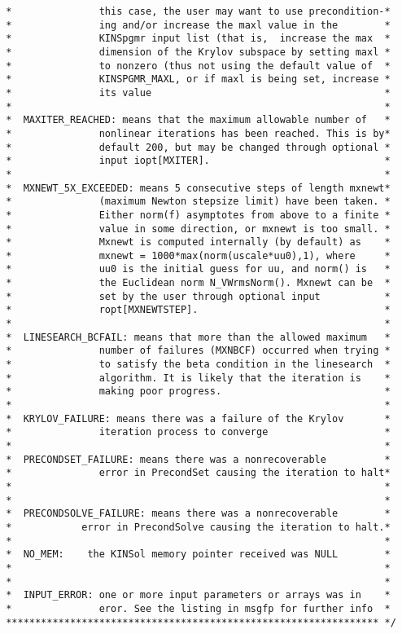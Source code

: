 \documentclass[11pt]{article}
\begin{document}
\begin{verbatim}
 *               this case, the user may want to use precondition-*
 *               ing and/or increase the maxl value in the        * 
 *               KINSpgmr input list (that is,  increase the max  *
 *               dimension of the Krylov subspace by setting maxl *
 *               to nonzero (thus not using the default value of  *
 *               KINSPGMR_MAXL, or if maxl is being set, increase *
 *               its value                                        *
 *                                                                *
 *  MAXITER_REACHED: means that the maximum allowable number of   *
 *               nonlinear iterations has been reached. This is by*
 *               default 200, but may be changed through optional *
 *               input iopt[MXITER].                              *
 *                                                                *
 *  MXNEWT_5X_EXCEEDED: means 5 consecutive steps of length mxnewt*
 *               (maximum Newton stepsize limit) have been taken. *
 *               Either norm(f) asymptotes from above to a finite *
 *               value in some direction, or mxnewt is too small. *
 *               Mxnewt is computed internally (by default) as    *
 *               mxnewt = 1000*max(norm(uscale*uu0),1), where     *
 *               uu0 is the initial guess for uu, and norm() is   *
 *               the Euclidean norm N_VWrmsNorm(). Mxnewt can be  *
 *               set by the user through optional input           *
 *               ropt[MXNEWTSTEP].                                *
 *                                                                *
 *  LINESEARCH_BCFAIL: means that more than the allowed maximum   *
 *               number of failures (MXNBCF) occurred when trying *
 *               to satisfy the beta condition in the linesearch  *
 *               algorithm. It is likely that the iteration is    *
 *               making poor progress.                            *
 *                                                                *
 *  KRYLOV_FAILURE: means there was a failure of the Krylov       *
 *               iteration process to converge                    *
 *                                                                *
 *  PRECONDSET_FAILURE: means there was a nonrecoverable          *
 *               error in PrecondSet causing the iteration to halt*
 *                                                                *
 *                                                                *
 *  PRECONDSOLVE_FAILURE: means there was a nonrecoverable        *
 *            error in PrecondSolve causing the iteration to halt.*
 *                                                                *
 *  NO_MEM:    the KINSol memory pointer received was NULL        *
 *                                                                *
 *                                                                *
 *  INPUT_ERROR: one or more input parameters or arrays was in    *
 *               eror. See the listing in msgfp for further info  *
 **************************************************************** */
\end{verbatim}
\normalsize
\end{document}
